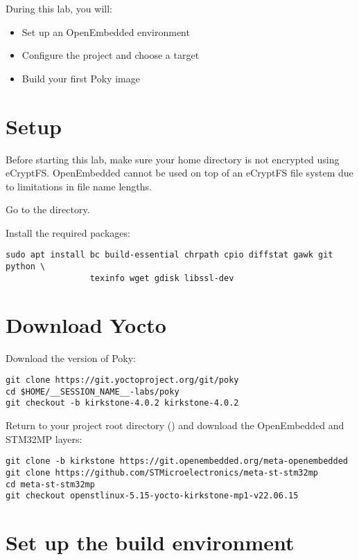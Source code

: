 
During this lab, you will:
\begin{itemize}
  \item Set up an OpenEmbedded environment
  \item Configure the project and choose a target
  \item Build your first Poky image
\end{itemize}

\section{Setup}

Before starting this lab, make sure your home directory is not
encrypted using eCryptFS. OpenEmbedded cannot be used on top of an eCryptFS file
system due to limitations in file name lengths.

Go to the  directory.

Install the required packages:
\begin{verbatim}
sudo apt install bc build-essential chrpath cpio diffstat gawk git python \
                 texinfo wget gdisk libssl-dev
\end{verbatim}

\section{Download Yocto}

Download the  version of Poky:
\begin{verbatim}
git clone https://git.yoctoproject.org/git/poky
cd $HOME/__SESSION_NAME__-labs/poky
git checkout -b kirkstone-4.0.2 kirkstone-4.0.2
\end{verbatim}

Return to your project root directory ()
and download the OpenEmbedded and STM32MP layers:
\begin{verbatim}
git clone -b kirkstone https://git.openembedded.org/meta-openembedded
git clone https://github.com/STMicroelectronics/meta-st-stm32mp
cd meta-st-stm32mp
git checkout openstlinux-5.15-yocto-kirkstone-mp1-v22.06.15
\end{verbatim}

\section{Set up the build environment}

